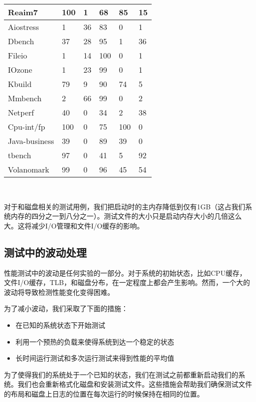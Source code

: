 {
\center
{}
\tabletail{\hline}

\begin{supertabular}{|p{3cm}|p{1.5cm}|p{1.5cm}|p{1.5cm}|p{1.5cm}|p{1.5cm}|}
\hline
Reaim7 & 100 & 1 & 68 & 85 & 15\\
\hline
Aiostress & 1 & 36 & 83 & 0 & 1\\
\hline
Dbench & 37 & 28 & 95 & 1 & 36\\
\hline
Fileio & 1 & 14 & 100 &0 &1\\
\hline
IOzone & 1 & 23 & 99  & 0 &1\\
\hline
Kbuild & 79 & 9 & 90 & 74 & 5\\
\hline
Mmbench & 2 & 66 & 99 &  0 & 2\\
\hline
Netperf & 40 & 0 & 34 & 2 &38\\
\hline
Cpu-int/fp & 100 & 0 & 75 & 100 & 0\\
\hline
Java-business & 39 & 0 & 89 &  39 &0\\
\hline
tbench & 97 & 0 & 41 & 5 & 92\\
\hline
Volanomark & 99 & 0 & 96 & 45 & 54\\
\end{supertabular}
\ 

}


对于和磁盘相关的测试用例，我们把启动时的主内存降低到仅有1GB（这占我们系统内存的四分之一到八分之一）。测试文件的大小只是启动内存大小的几倍这么大。这将减少I/O管理和文件I/O缓存的影响。
\subsection{测试中的波动处理}
性能测试中的波动是任何实验的一部分。对于系统的初始状态，比如CPU缓存，文件I/O缓存，TLB，和磁盘分布，在一定程度上都会产生影响。然而，一个大的波动将导致检测性能变化变得困难。

为了减小波动，我们采取了下面的措施：
\begin{itemize}
\item 在已知的系统状态下开始测试
\item 利用一个预热的负载来使得系统到达一个稳定的状态
\item 长时间运行测试和多次运行测试来得到性能的平均值
\end{itemize}

为了使得我们的系统处于一个已知的状态，我们在测试之前都重新启动我们的系统。我们也会重新格式化磁盘和安装测试文件。这些措施会帮助我们确保测试文件的布局和磁盘上日志的位置在每次运行的时候保持在相同的位置。

